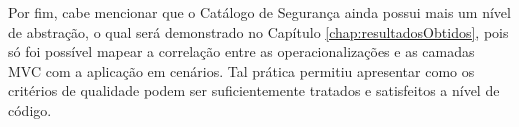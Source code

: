 Por fim, cabe mencionar que o Catálogo de Segurança ainda possui mais um nível de abstração, o qual será demonstrado no Capítulo \ref{chap:resultadosObtidos}, pois só foi possível mapear a correlação entre as operacionalizações e as camadas MVC
com a aplicação em cenários. Tal prática permitiu apresentar como os critérios de qualidade podem ser suficientemente tratados e satisfeitos a nível de código.
